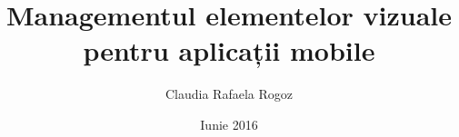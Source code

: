 \title{Managementul elementelor vizuale pentru aplicații mobile}
\author{Claudia Rafaela Rogoz}
\date{Iunie 2016}



\newcommand{\project}{MySuperProject}


